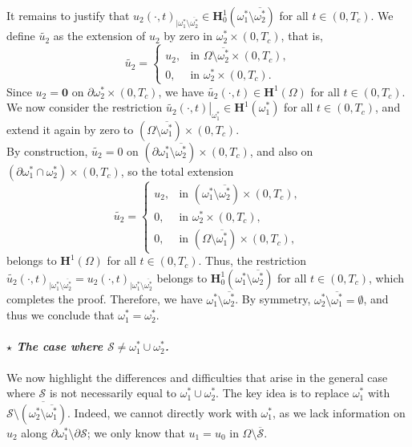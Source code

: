 \documentclass[a4paper,12pt,reqno,natbib]{amsart}
\begin{document}
\noindent It remains to justify that ${u_2(\cdot,t)}_{| \omega_1^* \setminus \overline{\omega_2^*}} \in \mathbf{H}_0^1\left(\omega_1^* \setminus \overline{\omega_2^*}\right)$ for all $t \in (0, T_c)$. We define $\widetilde{u_2}$ as the extension of $u_2$ by zero in $\omega_2^* \times (0, T_c)$, that is,
\[
\widetilde{u_2} = 
\begin{cases}
u_2, & \text{in } \Omega \setminus \overline{\omega_2^*} \times (0, T_c), \\
0, & \text{in } \omega_2^* \times (0, T_c).
\end{cases}
\]
Since $u_2 = \mathbf{0}$ on $\partial \omega_2^* \times (0, T_c)$, we have $\widetilde{u_2}(\cdot,t) \in \mathbf{H}^1(\Omega)$ for all $t \in (0, T_c)$. We now consider the restriction $\left.\widetilde{u_2}(\cdot,t)\right|_{\omega_1^*} \in \mathbf{H}^1(\omega_1^*)$ for all $t \in (0, T_c)$, and extend it again by zero to $(\Omega \setminus \overline{\omega_1^*}) \times (0, T_c)$.\\

\noindent By construction, $\widetilde{u_2} = 0$ on $(\partial \omega_1^* \setminus \overline{\omega_2^*}) \times (0, T_c)$, and also on $(\partial \omega_1^* \cap \omega_2^*) \times (0, T_c)$, so the total extension
\[
\widetilde{u_2} = 
\begin{cases}
u_2, & \text{in } (\omega_1^* \setminus \overline{\omega_2^*}) \times (0, T_c), \\
0, & \text{in } \omega_2^* \times (0, T_c), \\
0, & \text{in } (\Omega \setminus \overline{\omega_1^*}) \times (0, T_c),
\end{cases}
\]
belongs to $\mathbf{H}^1(\Omega)$ for all $t \in (0, T_c)$. Thus, the restriction $\widetilde{u_2}(\cdot,t)_{|\omega_1^* \setminus \overline{\omega_2^*}} = {u_2(\cdot,t)}_{| \omega_1^* \setminus \overline{\omega_2^*}}$ belongs to $\mathbf{H}_0^1\left(\omega_1^* \setminus \overline{\omega_2^*}\right)$ for all $t \in (0, T_c)$, which completes the proof. Therefore, we have $\omega_1^* \setminus \overline{\omega_2^*}$. By symmetry, \( \omega_2^* \setminus \overline{\omega_1^*} = \emptyset \), and thus we conclude that \( \omega_1^* = \omega_2^* \).\\




\paragraph{$\star$ \emph{The case where \( \mathcal{S} \neq \omega_1^* \cup \omega_2^* \).}} 
We now highlight the differences and difficulties that arise in the general case where \( \mathcal{S} \) is not necessarily equal to \( \omega_1^* \cup \omega_2^* \). The key idea is to replace \( \omega_1^* \) with \( \mathcal{S} \setminus \overline{\left( \omega_2^* \setminus \overline{\omega_1^*} \right)} \). Indeed, we cannot directly work with \( \omega_1^* \), as we lack information on \( u_2 \) along \( \partial \omega_1^* \setminus \partial \mathcal{S} \); we only know that \( u_1 = u_0 \) in \( \Omega \setminus \overline{\mathcal{S}} \).
\end{document}
